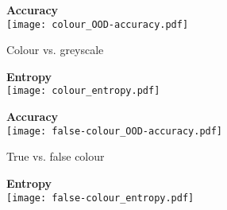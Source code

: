 \begin{figure}
	\begin{subfigure}{\figwidth}
			\centering
			\textbf{Accuracy}\\
			\texttt{[image: colour\_OOD-accuracy.pdf]}
			\vspace{\captionspace}
			\caption{Colour vs. greyscale}
			\vspace{\captionspaceII}
		\end{subfigure}\hfill
		\begin{subfigure}{\figwidth}
			\centering
			\textbf{Entropy}\\
			\texttt{[image: colour\_entropy.pdf]}
			\vspace{\captionspace}
			\caption*{}
			\vspace{\captionspaceII}
		\end{subfigure}\hfill
		\begin{subfigure}{\figwidth}
			\centering
			\textbf{Accuracy}\\
			\texttt{[image: false-colour\_OOD-accuracy.pdf]}
			\vspace{\captionspace}
			\caption{True vs. false colour}
			\vspace{\captionspaceII}
		\end{subfigure}\hfill
		\begin{subfigure}{\figwidth}
			\centering
			\textbf{Entropy}\\
			\texttt{[image: false-colour\_entropy.pdf]}
			\vspace{\captionspace}
			\caption*{}
			\vspace{\captionspaceII}
		\end{subfigure}\hfill
	

\end{figure}
